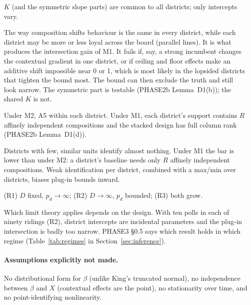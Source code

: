 \begin{assumption}
$K$ (and the symmetric slope parts) are common to all districts; only
intercepts vary.
\end{assumption}
\begin{plain}
The way composition shifts behaviour is the same in every district, while each
district may be more or less loyal across the board (parallel lines). It is
what produces the intersection gain of M1. It fails if, say, a strong
incumbent changes the contextual gradient in one district, or if ceiling and
floor effects make an additive shift impossible near 0 or 1, which is most
likely in the lopsided districts that tighten the bound most. The bound can then
exclude the truth and still look narrow. The symmetric part is testable
(PHASE2b Lemma~D1(b)); the shared $K$ is not.
\end{plain}

\begin{assumption}
Under M2, A5 within each district. Under M1, each district's support contains
$R$ affinely independent compositions and the stacked design has full column
rank (PHASE2b Lemma~D1(d)).
\end{assumption}
\begin{plain}
Districts with few, similar units identify almost nothing. Under M1 the bar is
lower than under M2: a district's baseline needs only $R$ affinely
independent compositions. Weak identification per district, combined with a
max/min over districts, biases plug-in bounds inward.
\end{plain}

\begin{assumption}
(R1) $D$ fixed, $p_d\to\infty$; (R2) $D\to\infty$, $p_d$ bounded; (R3) both
grow.
\end{assumption}
\begin{plain}
Which limit theory applies depends on the design. With ten polls in each of
ninety ridings (R2), district intercepts are incidental parameters and the
plug-in intersection is badly too narrow. PHASE3 \S0.5 says which result holds
in which regime (Table~\ref{tab:regimes} in Section~\ref{sec:inference}).
\end{plain}

\paragraph{Assumptions explicitly not made.} No distributional form for $\beta$
(unlike King's truncated normal), no independence between $\beta$ and $X$
(contextual effects are the point), no stationarity over time, and no
point-identifying nonlinearity.

